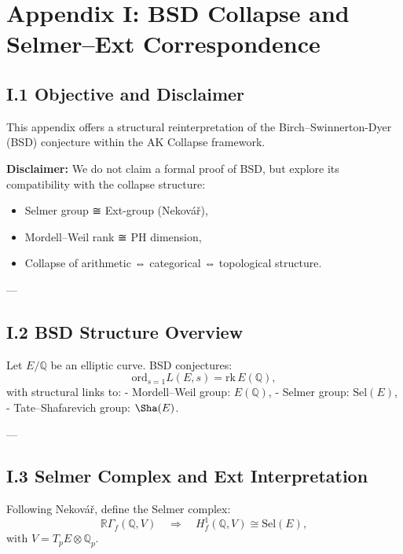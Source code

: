 \documentclass[11pt]{article}
\begin{document}

\section*{Appendix I: BSD Collapse and Selmer–Ext Correspondence}

\subsection*{I.1 Objective and Disclaimer}

This appendix offers a structural reinterpretation of the Birch–Swinnerton-Dyer (BSD) conjecture  
within the AK Collapse framework.  

\textbf{Disclaimer:}  
We do not claim a formal proof of BSD, but explore its compatibility with the collapse structure:
\begin{itemize}
  \item Selmer group ≅ Ext-group (Nekovář),
  \item Mordell–Weil rank ≅ PH dimension,
  \item Collapse of arithmetic ⇔ categorical ⇔ topological structure.
\end{itemize}

---

\subsection*{I.2 BSD Structure Overview}

Let $E/\mathbb{Q}$ be an elliptic curve. BSD conjectures:
\[
\mathrm{ord}_{s=1} L(E,s) = \mathrm{rk}\,E(\mathbb{Q}),
\]
with structural links to:
- Mordell–Weil group: $E(\mathbb{Q})$,
- Selmer group: $\mathrm{Sel}(E)$,
- Tate–Shafarevich group: $\Sha(E)$.

---

\subsection*{I.3 Selmer Complex and Ext Interpretation}

Following Nekovář, define the Selmer complex:
\[
\mathbb{R}\Gamma_f(\mathbb{Q}, V) \quad \Rightarrow \quad H^1_f(\mathbb{Q}, V) \cong \mathrm{Sel}(E),
\]
with $V = T_p E \otimes \mathbb{Q}_p$.
\end{document}
